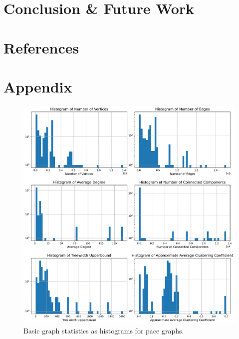 \documentclass{article}
\begin{document}
\section{Conclusion \& Future Work}
\label{sec:conclusion}

\section{References}



\section{Appendix}
\begin{figure}[H]
     \centering
     \includegraphics[width=\textwidth]{figures/pace_unweighted}
     \caption{Basic graph statistics as histograms for pace graphs.}
     \label{fig:pace_unweighted}
\end{figure}
\end{document}
